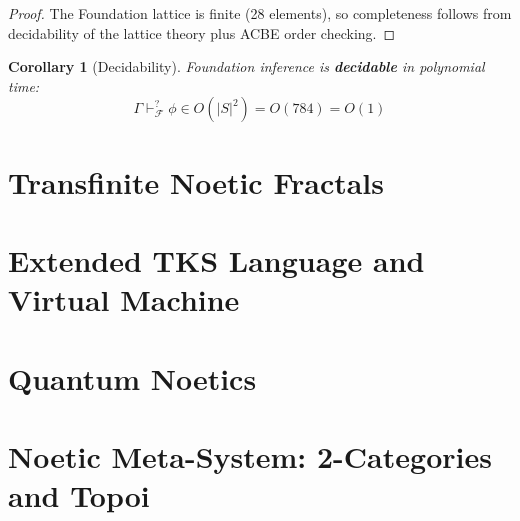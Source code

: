 \documentclass[11pt,twoside,openright]{book}
\theoremstyle{definition}
\theoremstyle{plain}
\newtheorem{corollary}[definition]{Corollary}
\theoremstyle{remark}
\newcommand{\Foundations}{\mathcal{F}}
\begin{document}
\begin{proof}
The Foundation lattice is finite (28 elements), so completeness follows from decidability of the lattice theory plus ACBE order checking.
\end{proof}

\begin{corollary}[Decidability]
\label{cor:foundation-decidability}
Foundation inference is \textbf{decidable} in polynomial time:
\[
\Gamma \vdash_\Foundations^? \phi \in O(|S|^2) = O(784) = O(1)
\]
\end{corollary}

\part{Transfinite Noetic Fractals}
\label{part:math-track}



\part{Extended TKS Language and Virtual Machine}
\label{part:compiler-track}



\part{Quantum Noetics}
\label{part:quantum-track}



\part{Noetic Meta-System: 2-Categories and Topoi}
\label{part:meta-track}
\end{document}
